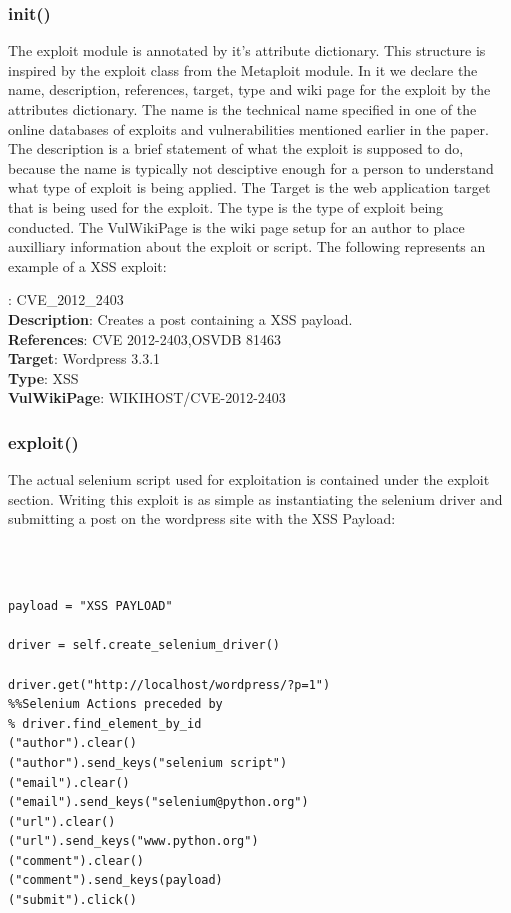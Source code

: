 \documentclass[letterpaper,twocolumn,10pt]{article}
\begin{document}
\subsubsection{init()}

The exploit module is annotated by it's attribute dictionary. This structure is inspired by the exploit class from the Metaploit module. In it we declare the name, description, references, target, type and wiki page for the exploit by the attributes dictionary.  The name is the technical name specified in one of the online databases of exploits and vulnerabilities mentioned earlier in the paper.  The description is a brief statement of what the exploit is supposed to do, because the name is typically not desciptive enough for a person to understand what type of exploit is being applied.  The Target is the web application target that is being used for the exploit.  The type is the type of exploit being conducted.  The VulWikiPage is the wiki page setup for an author to place auxilliary information about the exploit or script.  The following represents an example of a XSS exploit:\\

{\tt \small

:	CVE\_2012\_2403\\
{\bf Description}:		Creates a post containing a XSS payload.\\
{\bf References}:	CVE 2012-2403,OSVDB 81463 \\
{\bf Target}: 		Wordpress 3.3.1\\
{\bf Type}: 		XSS\\
{\bf VulWikiPage}: WIKIHOST/CVE-2012-2403

}

\subsubsection{exploit()}

The actual selenium script used for exploitation is contained under the exploit section.  Writing this exploit is as simple as instantiating the selenium driver and submitting a post on the wordpress site with the XSS Payload: 

{\tt \footnotesize
\begin{verbatim}

payload = "XSS PAYLOAD"

driver = self.create_selenium_driver()

driver.get("http://localhost/wordpress/?p=1")
%%Selenium Actions preceded by
% driver.find_element_by_id
("author").clear()
("author").send_keys("selenium script")
("email").clear()
("email").send_keys("selenium@python.org")
("url").clear()
("url").send_keys("www.python.org")
("comment").clear()
("comment").send_keys(payload)
("submit").click()

\end{verbatim}
}
\end{document}
